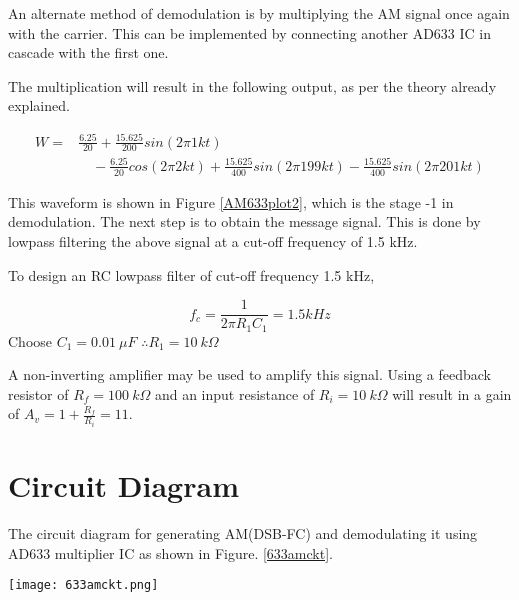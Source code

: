 An alternate method of demodulation is by multiplying the AM signal once again with the carrier. This can be implemented by connecting another AD633 IC in cascade with the first one.

\noindent The multiplication will result in the following output, as per the theory already explained.

\begin{equation}
\begin{split}
W=& \frac{6.25}{20} +\frac{15.625}{200}sin(2\pi 1kt)\\
&\quad  -\frac{6.25}{20}cos(2\pi 2kt) +\frac{15.625}{400}sin(2\pi199kt) -\frac{15.625}{400}sin(2\pi 201kt)
\end{split}
\end{equation}

\noindent This waveform is shown in Figure \ref{AM633plot2}, which is the stage -1 in demodulation. The next step is to obtain the message signal. This is done by lowpass filtering the above signal at a cut-off frequency of 1.5 kHz.

To design an RC lowpass filter of cut-off frequency 1.5 kHz,

\begin{equation}
f_c=\frac{1}{2\pi R_1C_1}=1.5kHz
\end{equation}
Choose $C_1=0.01\  \mu F$
$\therefore  R_1 =10 \ k \Omega$

A non-inverting amplifier may be used to amplify this signal. Using a feedback resistor of $R_f= 100 \ k \Omega$ and an input resistance of $R_i=10\ k\Omega$ will result in a gain of $A_v=1+\frac{R_f}{R_i}=11$.
\section*{Circuit Diagram}
The circuit diagram for generating AM(DSB-FC) and demodulating it using AD633 multiplier IC as shown in Figure. \ref{633amckt}. 

\begin{sidewaysfigure}[ht]
    \texttt{[image: 633amckt.png]}
    \caption{Circuit for AM generation and detection using AD633 multiplier IC}
    \label{633amckt}
\end{sidewaysfigure}


